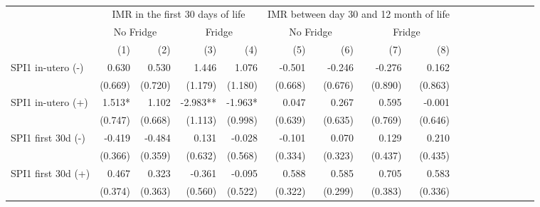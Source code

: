 \begin{table}[H]
\centering
\caption{}
\label{table6}
\begin{adjustbox}{max width=\linewidth}
\begin{tabular}{lrrrrrrrrrrrrrrrr}
\toprule
                                            &      \multicolumn{4}{c}{IMR in the first 30 days of life}     &   \multicolumn{4}{c}{IMR between day 30 and 12 month of life}      \\ 
\cmidrule(lr){2-5} \cmidrule(lr){6-9} \cmidrule(lr){10-13} \cmidrule(lr){14-17} 
                                            &      \multicolumn{2}{c}{No Fridge} &      \multicolumn{2}{c}{Fridge}     &  \multicolumn{2}{c}{No Fridge} &      \multicolumn{2}{c}{Fridge}      \\ 
\cmidrule(lr){2-5} \cmidrule(lr){6-9} \cmidrule(lr){10-13} \cmidrule(lr){14-17} 
                                            &        (1) &        (2) &        (3) &        (4) &       (5) &       (6) &       (7) &       (8)  \\ 
\midrule 
SPI1 in-utero  (-)                           &       0.630 &       0.530 &       1.446 &       1.076 &       -0.501 &       -0.246 &       -0.276 &        0.162  \\
                                             &     (0.669) &     (0.720) &     (1.179) &     (1.180) &      (0.668) &      (0.676) &      (0.890) &      (0.863)  \\
SPI1 in-utero  (+)                           &      1.513* &       1.102 &    -2.983** &     -1.963* &        0.047 &        0.267 &        0.595 &       -0.001  \\
                                             &     (0.747) &     (0.668) &     (1.113) &     (0.998) &      (0.639) &      (0.635) &      (0.769) &      (0.646)  \\
SPI1 first 30d  (-)                          &      -0.419 &      -0.484 &       0.131 &      -0.028 &       -0.101 &        0.070 &        0.129 &        0.210  \\
                                             &     (0.366) &     (0.359) &     (0.632) &     (0.568) &      (0.334) &      (0.323) &      (0.437) &      (0.435)  \\
SPI1 first 30d  (+)                          &       0.467 &       0.323 &      -0.361 &      -0.095 &        0.588 &        0.585 &        0.705 &        0.583  \\
                                             &     (0.374) &     (0.363) &     (0.560) &     (0.522) &      (0.322) &      (0.299) &      (0.383) &      (0.336)  \\

\end{tabular}
\end{adjustbox}
\end{table}
